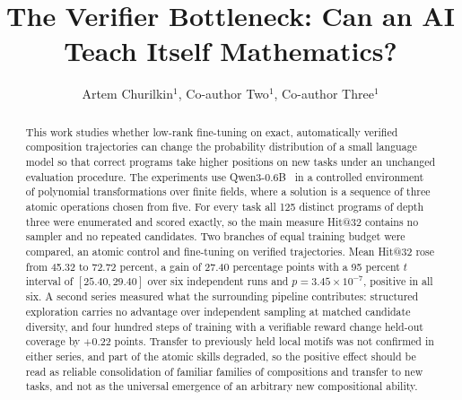 \documentclass{zapiski}
\date{}
\begin{document}
\title[The verifier bottleneck]{The Verifier Bottleneck: Can an AI Teach
Itself Mathematics?}

%
\author[Churilkin et al.]{Artem Churilkin$^{1}$, Co-author Two$^{1}$,
Co-author Three$^{1}$}
\address[Artem Churilkin]{$^{1}$Affiliation}

\begin{abstract}
This work studies whether low-rank fine-tuning on exact, automatically verified
composition trajectories can change the probability distribution of a small language
model so that correct programs take higher positions on new tasks under an unchanged
evaluation procedure. The experiments use Qwen3-0.6B~\cite{yang2025qwen3} in a
controlled environment of polynomial transformations over finite fields, where a
solution is a sequence of three atomic operations chosen from five. For every task all
125 distinct programs of depth three were enumerated and scored exactly, so the main
measure Hit@32 contains no sampler and no repeated candidates. Two branches of equal
training budget were compared, an atomic control and fine-tuning on verified
trajectories. Mean Hit@32 rose from 45.32 to 72.72 percent, a gain of 27.40 percentage
points with a 95 percent $t$ interval of $[25.40, 29.40]$ over six independent runs and
$p = 3.45 \times 10^{-7}$, positive in all six. A second series measured what the
surrounding pipeline contributes: structured exploration carries no advantage over
independent sampling at matched candidate diversity, and four hundred steps of training
with a verifiable reward change held-out coverage by $+0.22$ points. Transfer to
previously held local motifs was not confirmed in either series, and part of the atomic
skills degraded, so the positive effect should be read as reliable consolidation of
familiar families of compositions and transfer to new tasks, and not as the universal
emergence of an arbitrary new compositional ability.
\end{abstract}

\end{document}
